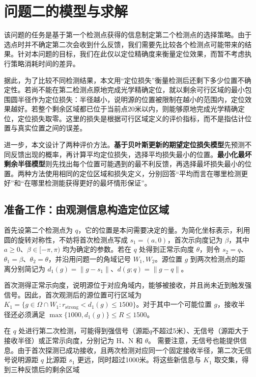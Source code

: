 \section{问题二的模型与求解}

该问题的任务是基于第一个检测点获得的信息制定第二个检测点的选择策略。由于选点时并不确定第二次会收到什么反馈，我们需要先比较各个检测点可能带来的结果。针对本问题的目标，我们在此仅以定位精确度来衡量定位效果，而暂不考虑执行策略消耗时间的差异。

据此，为了比较不同检测结果，本文用“定位损失”衡量检测后还剩下多少位置不确定性。若尚不能在第二检测点原地完成光学精确定位，就以剩余可行区域的最小包围圆半径作为定位损失：半径越小，说明源的位置被限制在越小的范围内，定位效果越好。若整个剩余区域都已位于当前点$20$米以内，则能够原地完成光学精确定位，定位损失取零。这里的损失是根据可行区域定义的评价指标，而不是指估计位置与真实位置之间的误差。

进一步，本文设计了两种评价方法。\textbf{基于贝叶斯更新的期望定位损失模型}先预测不同反馈出现的概率，再计算平均定位损失，选择平均损失最小的位置。\textbf{最小化最坏剩余半径模型}则先找出每个位置可能遇到的最不利反馈，再选择最坏损失最小的位置。两种方法使用相同的定位区域和损失定义，分别回答“平均而言在哪里检测更好”和“在哪里检测能获得更好的最坏情形保证”。

\subsection{准备工作：由观测信息构造定位区域}

首先设第二个检测点为 \(q\)，它的位置是本问需要决定的量。为简化坐标表示，利用圆的旋转对称性，不妨将首次检测点写成 \(s_1=(a,0)\)，首次示向度记为 \(\beta\)，其中 \(a\ge0\)、\(\beta\in[-\pi,\pi)\) 均为确定的参数。若在 \(q\) 处得到正常示向度 \(\theta\)，则令 \(s_2=q\)、\(\theta_1=\beta\)、\(\theta_2=\theta\)，并沿用问题一的角域记号 \(W_1,W_2\)。源位置 \(g\) 到两次检测点的距离分别简记为 \(d_1(g)=\|g-s_1\|\)、\(d(g;q)=\|g-q\|\)。

首次测得正常示向度，说明源位于对应角域内，能够被接收，并且尚未近到触发强信号。因此，首次观测后的源位置可行区域为 \(K_1=\{g\in\Omega\cap W_1:r_{\mathrm{strong}}<d_1(g)\le1500\}\)。对于其中一个可能位置 \(g\)，接收半径还必须满足 \(\max\{1000,d_1(g)\}\le R\le1500\)。

在 \(q\) 处进行第二次检测，可能得到强信号（源距$q$不超过5米）、无信号（源距大于接收半径）或正常示向度，分别记为 \(\mathrm H\)、\(\mathrm N\) 和 \(\theta\)。
需要注意，无信号也能提供信息。由于首次探测已成功接收，且两次检测对应同一个固定接收半径，第二次无信号说明源距 \(q\) 比源距 \(s_1\) 更远，同时超过1000米。将这些新信息与 \(K_1\) 取交集，得到三种反馈后的剩余区域

